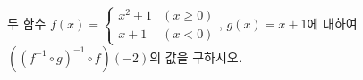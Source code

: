 두 함수 $f(x)=\begin{cases} x^2+1 & (x\ge 0) \\ x+1 & (x<0) \end{cases}$, $g(x)=x+1$에 대하여 $((f^{-1}\circ g)^{-1}\circ f)(-2)$의 값을 구하시오.
